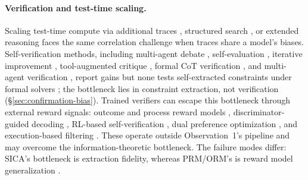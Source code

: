 \paragraph{Verification and test-time scaling.}
Scaling test-time compute via additional traces \citep{snell2025scaling}, structured search \citep{yao2023tree}, or extended reasoning \citep{guo2025deepseekr1, qwen2024qwq} faces the same correlation challenge when traces share a model's biases. Self-verification methods, including multi-agent debate \citep{liang2023encouraging, du2023improving}, self-evaluation \citep{xie2023selfevaluation, weng2023selfverification, madaan2023selfrefine, dhuliawala2023chainofverification}, iterative improvement \citep{shinn2023reflexion, zhou2023lats}, tool-augmented critique \citep{gou2024critic}, formal CoT verification \citep{zhu2025vericot, chen2025sets}, and multi-agent verification \citep{lifshitz2025mav}, report gains but none tests self-extracted constraints under formal solvers \citep[cf.][]{kamoi2024selfcorrect}; the bottleneck lies in constraint extraction, not verification (\S\ref{sec:confirmation-bias}). Trained verifiers can escape this bottleneck through external reward signals: outcome and process reward models \citep{cobbe2021gsm8k, lightman2024prm, wang2024mathshepherd}, discriminator-guided decoding \citep{khalifa2023grace}, RL-based self-verification \citep{zeng2025s2r}, dual preference optimization \citep{dupo2025}, and execution-based filtering \citep{li2022alphacode, chen2023codet}. These operate outside Observation~1's pipeline and may overcome the information-theoretic bottleneck. The failure modes differ: SICA's bottleneck is extraction fidelity, whereas PRM/ORM's is reward model generalization \citep{wang2024mathshepherd}.
